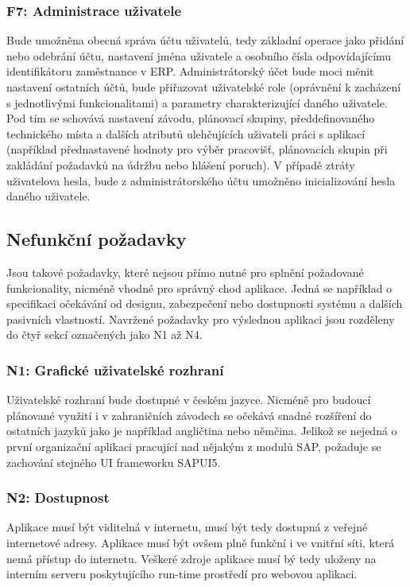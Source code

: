 \documentclass[thesis=M,czech]{FITthesis}[2012/06/26]
\begin{document}
\subsubsection{F7: Administrace uživatele}
\label{sssec:fc_administrace}
Bude umožněna obecná správa účtu uživatelů, tedy základní operace jako přidání nebo odebrání účtu, nastavení jména uživatele a osobního čísla odpovídajícímu identifikátoru zaměstnance v ERP. Administrátorský účet bude moci měnit nastavení ostatních účtů, bude přiřazovat uživatelské role (oprávnění k zacházení s jednotlivými funkcionalitami) a parametry charakterizující daného uživatele. Pod tím se schovává nastavení závodu, plánovací skupiny, předdefinovaného technického místa a dalších atributů ulehčujících uživateli práci s aplikací (například přednastavené hodnoty pro výběr pracovišť, plánovacích skupin při zakládání požadavků na údržbu nebo hlášení poruch). V případě ztráty uživatelova hesla, bude z administrátorského účtu umožněno inicializování hesla daného uživatele.

\subsection{Nefunkční požadavky}
Jsou takové požadavky, které nejsou přímo nutné pro splnění požadované funkcionality, nicméně vhodné pro správný chod aplikace. Jedná se například o specifikaci očekávání od designu, zabezpečení nebo dostupnosti systému a dalších pasivních vlastností. Navržené požadavky pro výslednou aplikaci jsou rozděleny do čtyř sekcí označených jako N1 až N4.
\subsubsection{N1: Grafické uživatelské rozhraní}
Uživatelské rozhraní bude dostupné v českém jazyce. Nicméně pro budoucí plánované využití i v zahraničních závodech se očekává snadné rozšíření do ostatních jazyků jako je například angličtina nebo němčina. Jelikož se nejedná o první organizační aplikaci pracující nad nějakým z modulů SAP, požaduje se zachování stejného UI frameworku SAPUI5.
\subsubsection{N2: Dostupnost}
Aplikace musí být viditelná v internetu, musí být tedy dostupná z veřejné internetové adresy. Aplikace musí být ovšem plně funkční i ve vnitřní síti, která nemá přístup do internetu. Veškeré zdroje aplikace musí bý tedy uloženy na interním serveru poskytujícího run-time prostředí pro webovou aplikaci.
\end{document}
